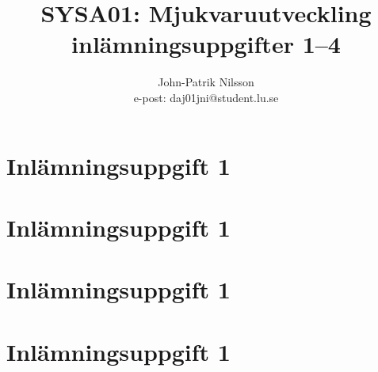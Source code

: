 \documentclass[a4paper,12pt]{article}
\title{\textsf{\textbf{SYSA01: Mjukvaruutveckling \\
    inlämningsuppgifter 1--4}}}
\author{John-Patrik Nilsson \\
	e-post: daj01jni@student.lu.se}
\begin{document}
\thispagestyle{empty}

\maketitle

\tableofcontents

\section{\textsf{Inlämningsuppgift 1}}

\section{\textsf{Inlämningsuppgift 1}}

\section{\textsf{Inlämningsuppgift 1}}

\section{\textsf{Inlämningsuppgift 1}}
\end{document}
